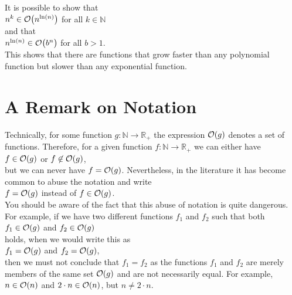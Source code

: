 \remark      
It is possible to show that
\\[0.2cm]
\hspace*{1.3cm}
$n^k \in \mathcal{O}\bigl(n^{\ln(n)}\bigr)$ \quad for all $k \in \mathbb{N}$
\\
and that
\\
\hspace*{1.3cm}
$n^{\ln(n)} \in \mathcal{O}\bigl(b^n\bigr)$ \quad for all $b > 1$.  
\\[0.2cm]
This shows that there are functions that grow faster than any polynomial
function but slower than any exponential function. \eox


\section{A Remark on Notation}
Technically, for some function $g:\mathbb{N} \rightarrow \mathbb{R}_+$ the expression $\mathcal{O}(g)$
denotes a set of functions.  Therefore, for a given function $f:\mathbb{N} \rightarrow \mathbb{R}_+$ we can
either have
\\[0.2cm]
\hspace*{1.3cm}
$f \in \mathcal{O}(g)$ \quad or \quad $f \not\in \mathcal{O}(g)$,
\\[0.2cm]
but we can never have $f = \mathcal{O}(g)$.  Nevertheless, in the literature it has become common to abuse the
notation and write
\\[0.2cm]
\hspace*{1.3cm}
$f = \mathcal{O}(g)$ \quad instead of \quad $f \in \mathcal{O}(g)$.
\\[0.2cm]
You should be aware of the fact that
this abuse of notation is quite dangerous.  For example, if we have two different functions $f_1$ and
$f_2$ such that both
\\[0.2cm]
\hspace*{1.3cm}
$f_1 \in \mathcal{O}(g)$ \quad and \quad $f_2 \in \mathcal{O}(g)$
\\[0.2cm]
holds, when we would write this as
\\[0.2cm]
\hspace*{1.3cm}
$f_1 = \mathcal{O}(g)$ \quad and \quad $f_2 = \mathcal{O}(g)$,
\\[0.2cm]
then we must not conclude that $f_1 = f_2$ as the functions $f_1$ and $f_2$ are merely members of
the same set $\mathcal{O}(g)$ and are not necessarily equal.  For example, $n \in \mathcal{O}(n)$ and 
$2 \cdot n \in \mathcal{O}(n)$,  but $n \not= 2 \cdot n$.

